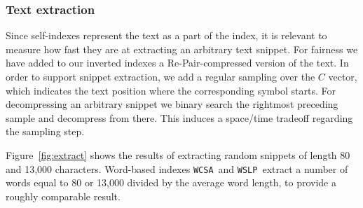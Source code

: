 \documentclass[review]{elsarticle}
\newcommand{\repair}{Re-Pair}
\newcommand{\wcsa}{\texttt{WCSA}}
\newcommand{\wslp}{\texttt{WSLP}}
\begin{document}
\subsubsection{Text extraction} \label{exp:pos:extract}

Since self-indexes represent the text as a part of the index, it is relevant
to measure how fast they are at extracting an arbitrary text snippet. For
fairness we have added to our inverted indexes a \repair-compressed version
of the text. In order to support snippet extraction, we add a regular
sampling over the $C$ vector, which indicates the text position where the
corresponding symbol starts. For decompressing an arbitrary snippet we binary
search the rightmost preceding sample and decompress from there. This induces
a space/time tradeoff regarding the sampling step.

Figure~\ref{fig:extract} shows the results of extracting random snippets
of length 80 and 13,000 characters. Word-based indexes \wcsa\ and \wslp\ extract a number of
words equal to 80 or 13,000 divided by the average word length, to provide
a roughly comparable result. 
\end{document}

